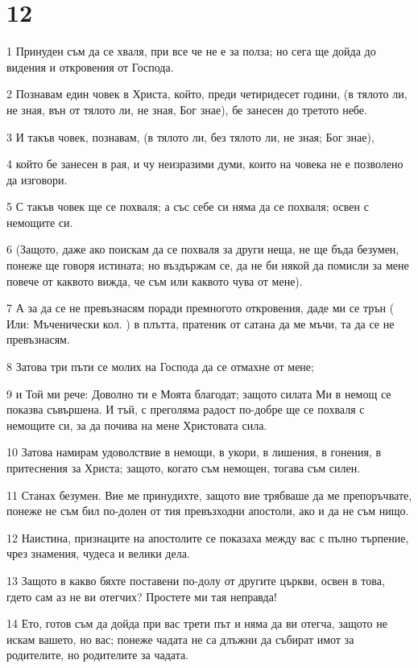 \chapter{12}

\par 1 Принуден съм да се хваля, при все че не е за полза; но сега ще дойда до видения и откровения от Господа.
\par 2 Познавам един човек в Христа, който, преди четиридесет години, (в тялото ли, не зная, вън от тялото ли, не зная, Бог знае), бе занесен до третото небе.
\par 3 И такъв човек, познавам, (в тялото ли, без тялото ли, не зная; Бог знае),
\par 4 който бе занесен в рая, и чу неизразими думи, които на човека не е позволено да изговори.
\par 5 С такъв човек ще се похваля; а със себе си няма да се похваля; освен с немощите си.
\par 6 (Защото, даже ако поискам да се похваля за други неща, не ще бъда безумен, понеже ще говоря истината; но въздържам се, да не би някой да помисли за мене повече от каквото вижда, че съм или каквото чува от мене).
\par 7 А за да се не превъзнасям поради премногото откровения, даде ми се трън ( Или: Мъченически кол. ) в плътта, пратеник от сатана да ме мъчи, та да се не превъзнасям.
\par 8 Затова три пъти се молих на Господа да се отмахне от мене;
\par 9 и Той ми рече: Доволно ти е Моята благодат; защото силата Ми в немощ се показва съвършена. И тъй, с преголяма радост по-добре ще се похваля с немощите си, за да почива на мене Христовата сила.
\par 10 Затова намирам удоволствие в немощи, в укори, в лишения, в гонения, в притеснения за Христа; защото, когато съм немощен, тогава съм силен.
\par 11 Станах безумен. Вие ме принудихте, защото вие трябваше да ме препоръчвате, понеже не съм бил по-долен от тия превъзходни апостоли, ако и да не съм нищо.
\par 12 Наистина, признаците на апостолите се показаха между вас с пълно търпение, чрез знамения, чудеса и велики дела.
\par 13 Защото в какво бяхте поставени по-долу от другите църкви, освен в това, гдето сам аз не ви отегчих? Простете ми тая неправда!
\par 14 Ето, готов съм да дойда при вас трети път и няма да ви отегча, защото не искам вашето, но вас; понеже чадата не са длъжни да събират имот за родителите, но родителите за чадата.
